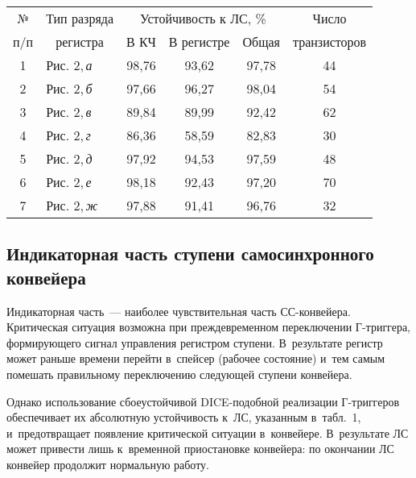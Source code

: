 \begin{multicols}{2}
\begin{table*}
\begin{center}
\begin{tabular}{|c|l|c|c|c|c|}
\hline
№ &\multicolumn{1}{c|}{Тип разряда} &\multicolumn{3}{c|}{Устойчивость к ЛС, \%}
&Число \\
\cline{3-5}
п/п&\multicolumn{1}{c|}{регистра}&В КЧ&В регистре&Общая&транзисторов\\
\hline
1&\hspace*{10pt}Рис. 2,\,\textit{а}&98,76&93,62&97,78&44\\
2&\hspace*{10pt}Рис. 2,\,\textit{б}&97,66&96,27&98,04&54\\
3&\hspace*{10pt}Рис. 2,\,\textit{в}&89,84&89,99&92,42&62\\
4&\hspace*{10pt}Рис. 2,\,\textit{г}&86,36&58,59&82,83&30\\
5&\hspace*{10pt}Рис. 2,\,\textit{д}&97,92&94,53&97,59&48\\
6&\hspace*{10pt}Рис. 2,\,\textit{е}&98,18&92,43&97,20&70\\
7&\hspace*{10pt}Рис. 2,\,\textit{ж}&97,88&91,41&96,76&32\\
\hline
\end{tabular}
\end{center}
\vspace*{-3pt}
\end{table*}

\vspace*{-6pt}

\subsection{Индикаторная часть ступени самосинхронного конвейера}

\vspace*{-2pt}

  Индикаторная часть~--- наиболее чувствительная часть СС-кон\-вей\-ера. Критическая 
ситуация возможна при преж\-де\-вре\-мен\-ном переключении \mbox{Г-триг}\-ге\-ра, 
формирующего сигнал управления регистром ступени. В~результате регистр 
может раньше времени перейти в~спейсер (рабочее состояние) и~тем самым 
помешать правильному переключению сле\-ду\-ющей ступени конвейера.
  
  Однако использование сбоеустойчивой DICE-по\-доб\-ной реализации 
  Г-триг\-ге\-ров~\cite{2-step} обеспечивает их абсолютную устойчивость 
  к~ЛС, указанным в~табл.~1, и~предотвращает появление критической ситуации 
  в~конвейере. В~результате ЛС может привести лишь к~временной приостановке 
конвейера: по окончании ЛС конвейер продолжит нормальную работу.


\end{multicols}
